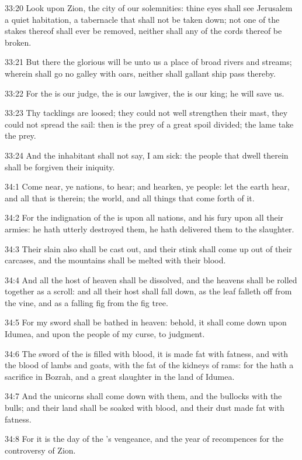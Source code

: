 33:20 Look upon Zion, the city of our solemnities: thine eyes shall see Jerusalem a quiet habitation, a tabernacle that shall not be taken down; not one of the stakes thereof shall ever be removed, neither shall any of the cords thereof be broken.

33:21 But there the glorious \LORD will be unto us a place of broad rivers and streams; wherein shall go no galley with oars, neither shall gallant ship pass thereby.

33:22 For the \LORD is our judge, the \LORD is our lawgiver, the \LORD is our king; he will save us.

33:23 Thy tacklings are loosed; they could not well strengthen their mast, they could not spread the sail: then is the prey of a great spoil divided; the lame take the prey.

33:24 And the inhabitant shall not say, I am sick: the people that dwell therein shall be forgiven their iniquity.

34:1 Come near, ye nations, to hear; and hearken, ye people: let the earth hear, and all that is therein; the world, and all things that come forth of it.

34:2 For the indignation of the \LORD is upon all nations, and his fury upon all their armies: he hath utterly destroyed them, he hath delivered them to the slaughter.

34:3 Their slain also shall be cast out, and their stink shall come up out of their carcases, and the mountains shall be melted with their blood.

34:4 And all the host of heaven shall be dissolved, and the heavens shall be rolled together as a scroll: and all their host shall fall down, as the leaf falleth off from the vine, and as a falling fig from the fig tree.

34:5 For my sword shall be bathed in heaven: behold, it shall come down upon Idumea, and upon the people of my curse, to judgment.

34:6 The sword of the \LORD is filled with blood, it is made fat with fatness, and with the blood of lambs and goats, with the fat of the kidneys of rams: for the \LORD hath a sacrifice in Bozrah, and a great slaughter in the land of Idumea.

34:7 And the unicorns shall come down with them, and the bullocks with the bulls; and their land shall be soaked with blood, and their dust made fat with fatness.

34:8 For it is the day of the \LORD's vengeance, and the year of recompences for the controversy of Zion.

